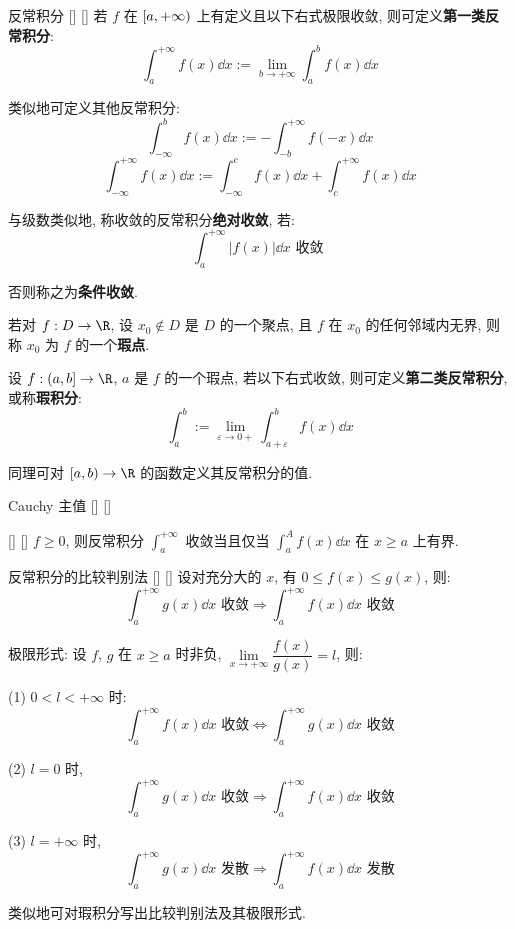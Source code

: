 \documentclass[UTF8]{ctexart}
\begin{document}
            \begin{dfn}
			    []
			    {反常积分}
			    []
			    []
                若 \(f\) 在 \(\Ico{a}{+\infty}\) 上有定义且以下右式极限收敛, 则可定义\textbf{第一类反常积分}: 
                \[\int_a^{+\infty}f(x)\dd x:=\lim_{b\to+\infty}\int_a^b f(x)\dd x\]

                类似地可定义其他反常积分: 
                \[\int_{-\infty}^b f(x)\dd x:=-\int_{-b}^{+\infty} f(-x)\dd x\]
                \[\int_{-\infty}^{+\infty} f(x)\dd x:=\int_{-\infty}^c f(x)\dd x+\int_c^{+\infty} f(x)\dd x\]

				与级数类似地, 称收敛的反常积分\textbf{绝对收敛}, 若: 
				\[\int_a^{+\infty}|f(x)|\dd x\text{ 收敛 }\]
				
				否则称之为\textbf{条件收敛}. 

				若对 \(f:D\to\R\), 设 \(x_0\notin D\) 是 \(D\) 的一个聚点, 且 \(f\) 在 \(x_0\) 的任何邻域内无界, 则称 \(x_0\) 为 \(f\) 的一个\textbf{瑕点}. 

				设 \(f:\Ioc{a}{b}\to\R\), \(a\) 是 \(f\) 的一个瑕点, 若以下右式收敛, 则可定义\textbf{第二类反常积分}, 或称\textbf{瑕积分}: 
				\[\int_a^b:=\lim_{\varepsilon\to 0+}\int_{a+\varepsilon}^b f(x)\dd x\]

				同理可对 \(\Ico{a}{b}\to\R\) 的函数定义其反常积分的值. 
            \end{dfn}
			
			\begin{dfn}
			    []
			    {Cauchy 主值}
			    []
			    []
			\end{dfn}
			
			\begin{thm}
				[]
				{}
				[]
				[]
				\(f\geq 0\), 则反常积分 \(\int_a^{+\infty}\) 收敛当且仅当 \(\int_a^A f(x)\dd x\) 在 \(x\geq a\) 上有界. 
			\end{thm}

			\begin{thm}
			    []
			    {反常积分的比较判别法}
			    []
			    []
				设对充分大的 \(x\), 有 \(0\leq f(x)\leq g(x)\), 则: 
				\[\int_a^{+\infty}g(x)\dd x\text{ 收敛}
				\Longrightarrow\int_a^{+\infty}f(x)\dd x\text{ 收敛}\]

			    {}
			    {极限形式: }
			    {}
			    {}
				设 \(f\), \(g\) 在 \(x\geq a\) 时非负, \(\lim\limits_{x\to+\infty}\dfrac{f(x)}{g(x)}=l\), 则: 

				(1) \(0<l<+\infty\) 时: 
				\[\int_a^{+\infty}f(x)\dd x\text{ 收敛}\iff\int_a^{+\infty}g(x)\dd x\text{ 收敛}\]

				(2) \(l=0\) 时, 
				\[\int_a^{+\infty}g(x)\dd x\text{ 收敛}\Longrightarrow\int_a^{+\infty}f(x)\dd x\text{ 收敛}\]

				(3) \(l=+\infty\) 时, 
				\[\int_a^{+\infty}g(x)\dd x\text{ 发散}\Longrightarrow\int_a^{+\infty}f(x)\dd x\text{ 发散}\]

				类似地可对瑕积分写出比较判别法及其极限形式. 
			\end{thm}
\end{document}
